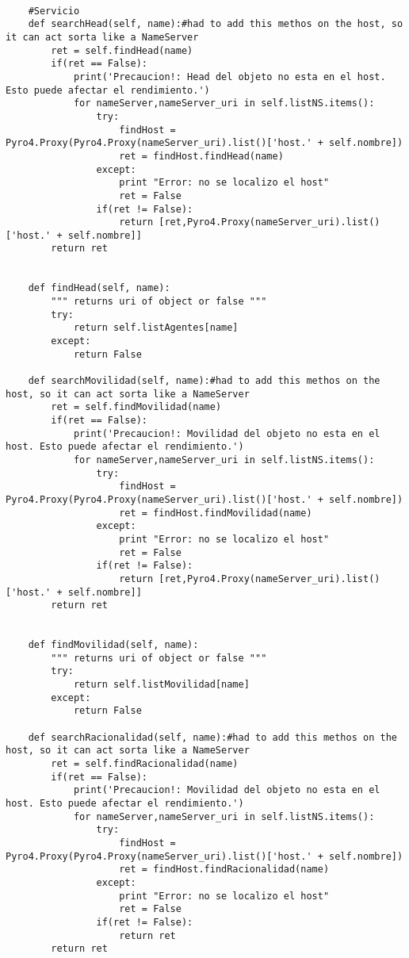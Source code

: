 \documentclass{article}
\begin{document}
\begin{lstlisting}
        
    #Servicio
    def searchHead(self, name):#had to add this methos on the host, so it can act sorta like a NameServer
        ret = self.findHead(name)
        if(ret == False):
            print('Precaucion!: Head del objeto no esta en el host. Esto puede afectar el rendimiento.')
            for nameServer,nameServer_uri in self.listNS.items():
                try:                
                    findHost = Pyro4.Proxy(Pyro4.Proxy(nameServer_uri).list()['host.' + self.nombre])
                    ret = findHost.findHead(name)
                except:
                    print "Error: no se localizo el host"
                    ret = False
                if(ret != False):
                    return [ret,Pyro4.Proxy(nameServer_uri).list()['host.' + self.nombre]]
        return ret
        
    
    def findHead(self, name):
        """ returns uri of object or false """
        try:
            return self.listAgentes[name]
        except:
            return False   
            
    def searchMovilidad(self, name):#had to add this methos on the host, so it can act sorta like a NameServer
        ret = self.findMovilidad(name)
        if(ret == False):
            print('Precaucion!: Movilidad del objeto no esta en el host. Esto puede afectar el rendimiento.')
            for nameServer,nameServer_uri in self.listNS.items():
                try:                
                    findHost = Pyro4.Proxy(Pyro4.Proxy(nameServer_uri).list()['host.' + self.nombre])
                    ret = findHost.findMovilidad(name)
                except:
                    print "Error: no se localizo el host"
                    ret = False
                if(ret != False):
                    return [ret,Pyro4.Proxy(nameServer_uri).list()['host.' + self.nombre]]
        return ret

    
    def findMovilidad(self, name):
        """ returns uri of object or false """
        try:
            return self.listMovilidad[name]
        except:
            return False   
            
    def searchRacionalidad(self, name):#had to add this methos on the host, so it can act sorta like a NameServer
        ret = self.findRacionalidad(name)
        if(ret == False):
            print('Precaucion!: Movilidad del objeto no esta en el host. Esto puede afectar el rendimiento.')
            for nameServer,nameServer_uri in self.listNS.items():
                try:                
                    findHost = Pyro4.Proxy(Pyro4.Proxy(nameServer_uri).list()['host.' + self.nombre])
                    ret = findHost.findRacionalidad(name)
                except:
                    print "Error: no se localizo el host"
                    ret = False
                if(ret != False):
                    return ret
        return ret
        

\end{lstlisting}
\end{document}
